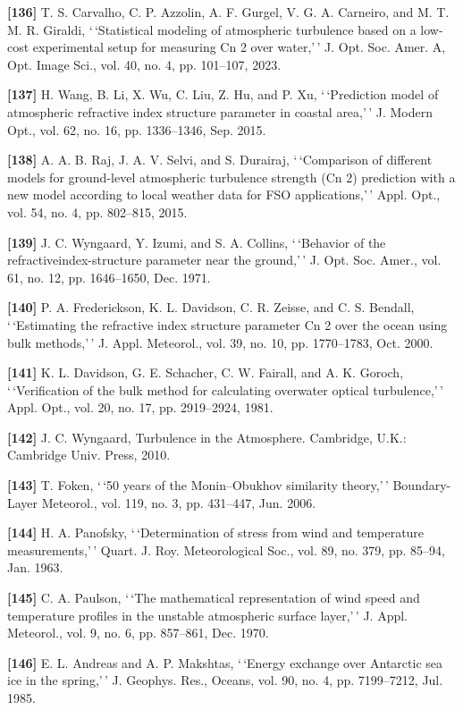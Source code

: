 \documentclass[
]{article}
\begin{document}
\textbf{{[}136{]}} T. S. Carvalho, C. P. Azzolin, A. F. Gurgel, V. G. A.
Carneiro, and M. T. M. R. Giraldi, `\,`Statistical modeling of
atmospheric turbulence based on a low-cost experimental setup for
measuring Cn 2 over water,'\,' J. Opt. Soc. Amer. A, Opt. Image Sci.,
vol. 40, no. 4, pp. 101--107, 2023.

\textbf{{[}137{]}} H. Wang, B. Li, X. Wu, C. Liu, Z. Hu, and P. Xu,
`\,`Prediction model of atmospheric refractive index structure parameter
in coastal area,'\,' J. Modern Opt., vol. 62, no. 16, pp. 1336--1346,
Sep. 2015.

\textbf{{[}138{]}} A. A. B. Raj, J. A. V. Selvi, and S. Durairaj,
`\,`Comparison of different models for ground-level atmospheric
turbulence strength (Cn 2) prediction with a new model according to
local weather data for FSO applications,'\,' Appl. Opt., vol. 54, no. 4,
pp. 802--815, 2015.

\textbf{{[}139{]}} J. C. Wyngaard, Y. Izumi, and S. A. Collins,
`\,`Behavior of the refractiveindex-structure parameter near the
ground,'\,' J. Opt. Soc. Amer., vol. 61, no. 12, pp. 1646--1650, Dec.
1971.

\textbf{{[}140{]}} P. A. Frederickson, K. L. Davidson, C. R. Zeisse, and
C. S. Bendall, `\,`Estimating the refractive index structure parameter
Cn 2 over the ocean using bulk methods,'\,' J. Appl. Meteorol., vol. 39,
no. 10, pp. 1770--1783, Oct. 2000.

\textbf{{[}141{]}} K. L. Davidson, G. E. Schacher, C. W. Fairall, and A.
K. Goroch, `\,`Verification of the bulk method for calculating overwater
optical turbulence,'\,' Appl. Opt., vol. 20, no. 17, pp. 2919--2924,
1981.

\textbf{{[}142{]}} J. C. Wyngaard, Turbulence in the Atmosphere.
Cambridge, U.K.: Cambridge Univ. Press, 2010.

\textbf{{[}143{]}} T. Foken, `\,`50 years of the Monin--Obukhov
similarity theory,'\,' Boundary-Layer Meteorol., vol. 119, no. 3, pp.
431--447, Jun. 2006.

\textbf{{[}144{]}} H. A. Panofsky, `\,`Determination of stress from wind
and temperature measurements,'\,' Quart. J. Roy. Meteorological Soc.,
vol. 89, no. 379, pp. 85--94, Jan. 1963.

\textbf{{[}145{]}} C. A. Paulson, `\,`The mathematical representation of
wind speed and temperature profiles in the unstable atmospheric surface
layer,'\,' J. Appl. Meteorol., vol. 9, no. 6, pp. 857--861, Dec. 1970.

\textbf{{[}146{]}} E. L. Andreas and A. P. Makshtas, `\,`Energy exchange
over Antarctic sea ice in the spring,'\,' J. Geophys. Res., Oceans, vol.
90, no. 4, pp. 7199--7212, Jul. 1985.
\end{document}
